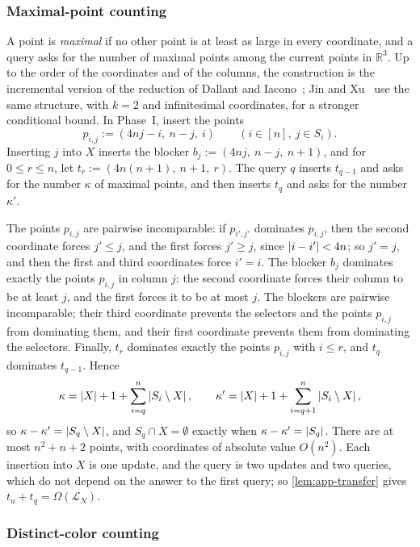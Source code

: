 \subsubsection{Maximal-point counting}\label{sec:maxima}

A point is \emph{maximal} if no other point is at least as large in every coordinate, and a query asks for the number of maximal points among the current points in $\mathbb R^3$. Up to the order of the coordinates and of the columns, the construction is the incremental version of the reduction of Dallant and Iacono~\cite[Theorem~14]{dallant_conditional_2022}; Jin and Xu~\cite[Section~5.1, proof of Theorem~1.10]{jin_tight_2022} use the same structure, with $k=2$ and infinitesimal coordinates, for a stronger conditional bound. In Phase~I, insert the points
\[
 p_{i,j}:=(4nj-i,\ n-j,\ i)\qquad(i\in[n],\ j\in S_i).
\]
Inserting $j$ into $X$ inserts the blocker $b_j:=(4nj,\ n-j,\ n+1)$, and for $0\le r\le n$, let $t_r:=(4n(n+1),\ n+1,\ r)$. The query $q$ inserts $t_{q-1}$ and asks for the number $\kappa$ of maximal points, and then inserts $t_q$ and asks for the number $\kappa'$.

The points $p_{i,j}$ are pairwise incomparable: if $p_{i',j'}$ dominates $p_{i,j}$, then the second coordinate forces $j'\le j$, and the first forces $j'\ge j$, since $\left|i-i'\right|<4n$; so $j'=j$, and then the first and third coordinates force $i'=i$. The blocker $b_j$ dominates exactly the points $p_{i,j}$ in column $j$: the second coordinate forces their column to be at least $j$, and the first forces it to be at most $j$. The blockers are pairwise incomparable; their third coordinate prevents the selectors and the points $p_{i,j}$ from dominating them, and their first coordinate prevents them from dominating the selectors. Finally, $t_r$ dominates exactly the points $p_{i,j}$ with $i\le r$, and $t_q$ dominates $t_{q-1}$. Hence
\[
 \kappa=\left|X\right|+1+\sum_{i=q}^{n}\left|S_i\setminus X\right|,\qquad
 \kappa'=\left|X\right|+1+\sum_{i=q+1}^{n}\left|S_i\setminus X\right|,
\]
so $\kappa-\kappa'=\left|S_q\setminus X\right|$, and $S_q\cap X=\emptyset$ exactly when $\kappa-\kappa'=\left|S_q\right|$. There are at most $n^2+n+2$ points, with coordinates of absolute value $O(n^2)$. Each insertion into $X$ is one update, and the query is two updates and two queries, which do not depend on the answer to the first query; so \cref{lem:app-transfer} gives $t_u+t_q=\Omega(\mathcal L_N)$.

\subsubsection{Distinct-color counting}\label{sec:distinct-color-counting}

